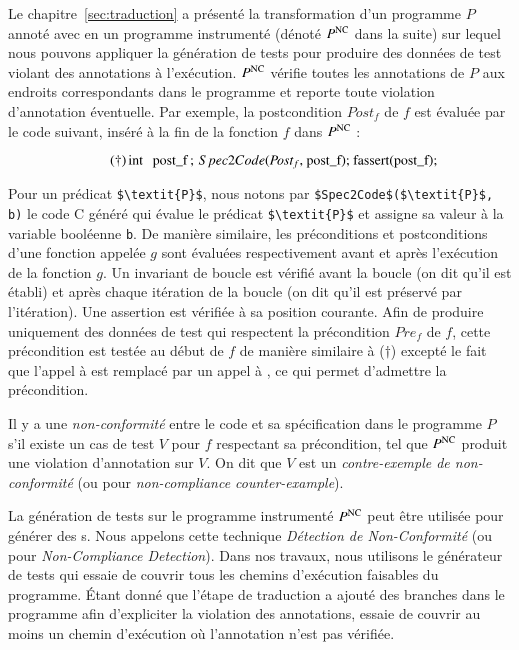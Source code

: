 Le chapitre~\ref{sec:traduction} a présenté la transformation d'un programme
$P$ annoté avec \eacsl en un programme instrumenté (dénoté $P^\mathrm{NC}$ dans la
suite) sur lequel nous pouvons appliquer la génération de tests pour produire
des données de test violant des annotations à l'exécution.
$P^\mathrm{NC}$ vérifie toutes les annotations de $P$ aux endroits correspondants dans
le programme et reporte toute violation d'annotation éventuelle.
Par exemple, la postcondition $\textit{Post}_f$ de $f$ est évaluée par le code
suivant, inséré à la fin de la fonction $f$ dans $P^\mathrm{NC}$ :

\begin{equation}\tag{$\dagger$}
\mbox{\lstinline[mathescape]'int post_f;  $\ Spec2Code$($\textit{Post}_f$, post_f); fassert(post_f);'}
\end{equation}

Pour un prédicat \eacsl \lstinline[mathescape]'$\textit{P}$',
nous notons par \lstinline[mathescape]'$Spec2Code$($\textit{P}$, b)'
le code C généré qui évalue le prédicat \lstinline[mathescape]'$\textit{P}$'
et assigne sa valeur à la variable booléenne \lstinline[mathescape]'b'.
De manière similaire, les préconditions et postconditions d'une fonction appelée
$g$ sont évaluées respectivement avant et après l'exécution de la fonction $g$.
Un invariant de boucle est vérifié avant la boucle (on dit qu'il est établi) et
après chaque itération de la boucle (on dit qu'il est préservé par l'itération).
Une assertion est vérifiée à sa position courante.
Afin de produire uniquement des données de test qui respectent la précondition
$\textit{Pre}_f$ de $f$, cette précondition est testée au début de $f$ de
manière similaire à ($\dagger$) excepté le fait que l'appel à \fassert est
remplacé par un appel à \fassume, ce qui permet d'admettre la précondition.

\begin{definition} 
  \label{def:NC}
  Il y a une \emph{non-conformité} entre le code et sa spécification dans le
  programme $P$ s'il existe un cas de test $V$ pour $f$ respectant sa
  précondition, tel que $P^{\mathrm{NC}}$ produit une violation d'annotation sur $V$.
  On dit que $V$ est un \emph{contre-exemple de non-conformité} (ou \NCCE pour
  \textit{non-compliance counter-example}).
\end{definition}

La génération de tests sur le programme instrumenté $P^{\mathrm{NC}}$ peut être utilisée
pour générer des \NCCE{}s.
Nous appelons cette technique \emph{Détection de Non-Conformité} (ou \NCD pour
\textit{Non-Compliance Detection}).
Dans nos travaux, nous utilisons le générateur de tests \pathcrawler qui essaie
de couvrir tous les chemins d'exécution faisables du programme.
Étant donné que l'étape de traduction a ajouté des branches dans le programme
afin d'expliciter la violation des annotations, \pathcrawler essaie de couvrir
au moins un chemin d'exécution où l'annotation n'est pas vérifiée.

